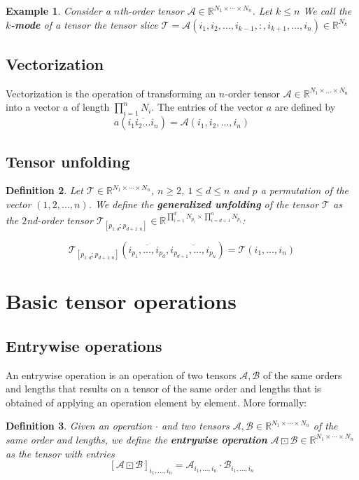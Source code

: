 \documentclass[11pt,a4paper,openright,oneside]{book}
\numberwithin{equation}{section}
\newtheorem{defn0}{Definition}[chapter]
\newtheorem{example0}[defn0]{Example}
\newenvironment{definition}{ \begin{defn0}}{\end{defn0}}
\newenvironment{example}{ \begin{example0}\rm}{\end{example0}}
\begin{document}
\begin{example}
    Consider a $n$th-order tensor $\mathcal{A} \in \mathbb{R}^{N_1 \times \cdots \times N_n}$. Let $k \leqslant n$ We call the \textbf{$k$-mode} of a tensor
    the tensor slice $\mathcal{T} = \mathcal{A}(i_1, i_2, \dots, i_{k-1}, :, i_{k+1}, \dots, i_n) \in \mathbb{R}^{N_k}$
\end{example}

\subsection*{Vectorization}

Vectorization is the operation of transforming an $n$-order tensor $\mathcal{A} \in \mathbb{R}^{N_1 \times \dots \times N_n}$
into a vector $a$ of length $\prod_{i=1}^{n} N_i$. The entries of the vector $a$ are defined by $$a(\overline{i_1 i_2 \dots i_n}) = 
\mathcal{A}(i_1, i_2, \dots, i_n)$$


\subsection*{Tensor unfolding}

\begin{definition}
Let $\mathcal{T} \in \mathbb{R}^{N_1 \times \cdots \times N_n}$, $n \geqslant 2$, $1 \leqslant d \leqslant n$ and $p$ a permutation of the vector $(1,2,\dots, n)$. We define the
\textbf{generalized unfolding} of the tensor $\mathcal{T}$ as the $2$nd-order tensor 
$\mathcal{T}_{[p_{1:d};p_{d+1:n}]} \in \mathbb{R}^{\prod_{i=1}^d N_{p_i} \times \prod_{i=d+1}^n N_{p_i}}$:

$$ \mathcal{T}_{[p_{1:d};p_{d+1:n}]} (\overline{i_{p_1}, \dots, i_{p_d}}, \overline{i_{p_{d+1}}, \dots, i_{p_n}}) = \mathcal{T}(i_1, \dots, i_n)$$
\end{definition}

\section{Basic tensor operations}

\subsection*{Entrywise operations}
An entrywise operation is an operation of two tensors $\mathcal{A}, \mathcal{B}$ of the same orders and lengths
that results on a tensor of the same order and lengths that is obtained of applying an operation element by element.
More formally:
\begin{definition}
    Given an operation $\cdot$ and two tensors $\mathcal{A}, \mathcal{B} \in \mathbb{R}^{N_1 \times \cdots \times N_n}$ of the same order and lengths,
    we define the \textbf{entrywise operation} $\mathcal{A} \boxdot \mathcal{B} \in \mathbb{R}^{N_1 \times \cdots \times N_n}$ as the tensor with entries
    $$ [\mathcal{A} \boxdot \mathcal{B}]_{i_1, \dots, i_n} = \mathcal{A}_{i_1, \dots, i_n} \cdot \mathcal{B}_{i_1, \dots, i_n} $$
\end{definition}
\end{document}
